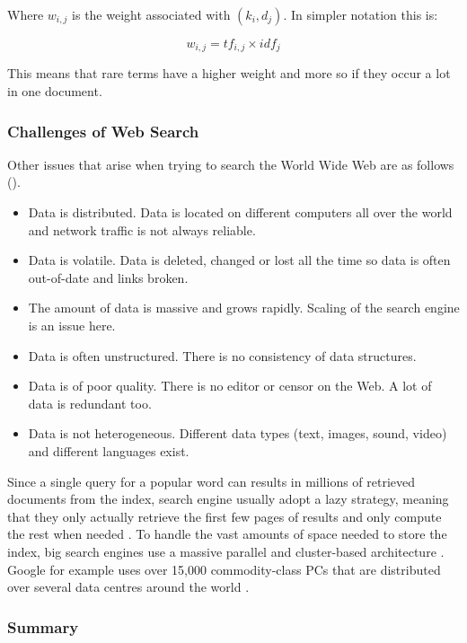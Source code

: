 Where $w_{i,j}$ is the weight associated with $(k_i,d_j)$. In simpler notation this is:

\begin{equation}
  w_{i,j} = tf_{i,j}\times idf_j
\end{equation}

This means that rare terms have a higher weight and more so if they occur a lot in one document.

\subsubsection*{Challenges of Web Search}

Other issues that arise when trying to search the World Wide Web are as follows (\citep[p.449]{Baeza-Yates2011}).

\begin{itemize}
  \item Data is distributed. Data is located on different computers all over the world and network traffic is not always reliable.
  \item Data is volatile. Data is deleted, changed or lost all the time so data is often out-of-date and links broken.
  \item The amount of data is massive and grows rapidly. Scaling of the search engine is an issue here.
  \item Data is often unstructured. There is no consistency of data structures.
  \item Data is of poor quality. There is no editor or censor on the Web. A lot of data is redundant too.
  \item Data is not heterogeneous. Different data types (text, images, sound, video) and different languages exist.
\end{itemize}

Since a single query for a popular word can results in  millions of retrieved documents from the index, search engine usually adopt a lazy strategy, meaning that they only actually retrieve the first few pages of results and only compute the rest when needed \citep[p.459]{Baeza-Yates2011}. To handle the vast amounts of space needed to store the index, big search engines use a massive parallel and cluster-based architecture \citep[p.459]{Baeza-Yates2011}. Google for example uses over 15,000 commodity-class PCs that are distributed over several data centres around the world \citep{Dean2003}.

\subsubsection*{Summary}

